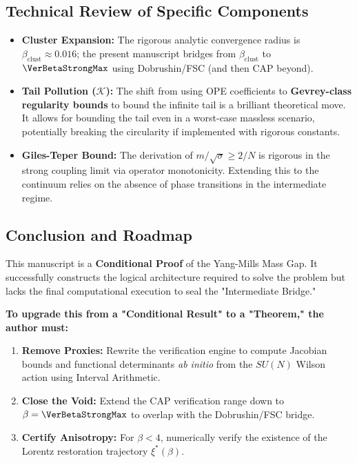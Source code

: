\subsection{Technical Review of Specific Components}

\begin{itemize}
    \item \textbf{Cluster Expansion:} The rigorous analytic convergence radius is $\beta_{\mathrm{clust}}\approx 0.016$; the present manuscript bridges from $\beta_{\mathrm{clust}}$ to $\VerBetaStrongMax$ using Dobrushin/FSC (and then CAP beyond).
    \item \textbf{Tail Pollution ($\mathcal{K}$):} The shift from using OPE coefficients to \textbf{Gevrey-class regularity bounds} to bound the infinite tail is a brilliant theoretical move. It allows for bounding the tail even in a worst-case massless scenario, potentially breaking the circularity if implemented with rigorous constants.
    \item \textbf{Giles-Teper Bound:} The derivation of $m/\sqrt{\sigma} \ge 2/N$ is rigorous in the strong coupling limit via operator monotonicity. Extending this to the continuum relies on the absence of phase transitions in the intermediate regime.
\end{itemize}

\subsection{Conclusion and Roadmap}

This manuscript is a \textbf{Conditional Proof} of the Yang-Mills Mass Gap. It successfully constructs the logical architecture required to solve the problem but lacks the final computational execution to seal the "Intermediate Bridge."

\textbf{To upgrade this from a "Conditional Result" to a "Theorem," the author must:}

\begin{enumerate}
    \item \textbf{Remove Proxies:} Rewrite the verification engine to compute Jacobian bounds and functional determinants \textit{ab initio} from the $SU(N)$ Wilson action using Interval Arithmetic.
    \item \textbf{Close the Void:} Extend the CAP verification range down to $\beta = \VerBetaStrongMax$ to overlap with the Dobrushin/FSC bridge.
    \item \textbf{Certify Anisotropy:} For $\beta < 4$, numerically verify the existence of the Lorentz restoration trajectory $\xi^*(\beta)$.
\end{enumerate}


